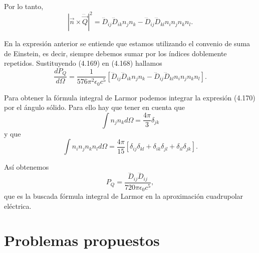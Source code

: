 \documentclass[12pt,a4paper]{book}
\begin{document}
Por lo tanto,
\begin{equation}
|\vec{n} \times \dddot{\vec{Q}}|^2 = \dddot{D}_{ij}\dddot{D}_{ik}n_j n_k - \dddot{D}_{ij}\dddot{D}_{kl}n_i n_j n_k n_l.
\end{equation}

En la expresión anterior se entiende que estamos utilizando el convenio de suma de Einstein, es decir, siempre debemos sumar por los índices doblemente repetidos. Sustituyendo (4.169) en (4.168) hallamos
\begin{equation}
\frac{dP_Q}{d\Omega} = \frac{1}{576\pi^2 \epsilon_0 c^5}[\dddot{D}_{ij}\dddot{D}_{ik}n_j n_k - \dddot{D}_{ij}\dddot{D}_{kl}n_i n_j n_k n_l].
\end{equation}

Para obtener la fórmula integral de Larmor podemos integrar la expresión (4.170) por el ángulo sólido. Para ello hay que tener en cuenta que
\begin{equation}
\int n_j n_k d\Omega = \frac{4\pi}{3}\delta_{jk}
\end{equation}
y que
\begin{equation}
\int n_i n_j n_k n_l d\Omega = \frac{4\pi}{15}[\delta_{ij}\delta_{kl} + \delta_{ik}\delta_{jl} + \delta_{il}\delta_{jk}].
\end{equation}

Así obtenemos
\begin{equation}
P_Q = \frac{\dddot{D}_{ij}\dddot{D}_{ij}}{720\pi\epsilon_0 c^5},
\end{equation}
que es la buscada fórmula integral de Larmor en la aproximación cuadrupolar eléctrica.

\section{Problemas propuestos}
\end{document}
